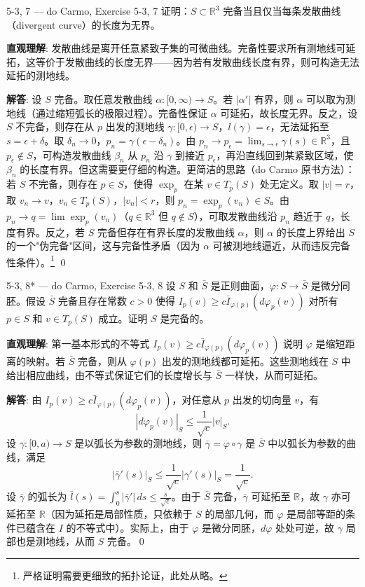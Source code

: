 \begin{exercise}{5-3, 7 — do Carmo, Exercise 5-3, 7}
证明：$S \subset \mathbb{R}^3$ 完备当且仅当每条发散曲线（divergent curve）的长度为无界。
\end{exercise}
\begin{solution}
\textbf{直观理解}: 发散曲线是离开任意紧致子集的可微曲线。完备性要求所有测地线可延拓，这等价于发散曲线的长度无界——因为若有发散曲线长度有界，则可构造无法延拓的测地线。

\textbf{解答}: 设 $S$ 完备。取任意发散曲线 $\alpha: [0,\infty)\to S$。若 $|\alpha'|$ 有界，则 $\alpha$ 可以取为测地线（通过缩短弧长的极限过程）。完备性保证 $\alpha$ 可延拓，故长度无界。反之，设 $S$ 不完备，则存在从 $p$ 出发的测地线 $\gamma: [0,\epsilon)\to S$，$l(\gamma) = \epsilon$，无法延拓至 $s=\epsilon + \delta$。取 $\delta_n \to 0$，$p_n = \gamma(\epsilon - \delta_n)$。由 $p_n \to p_\epsilon = \lim_{s\to\epsilon}\gamma(s) \in \mathbb{R}^3$，且 $p_\epsilon \notin S$，可构造发散曲线 $\beta_n$ 从 $p_n$ 沿 $\gamma$ 到接近 $p_\epsilon$，再沿直线回到某紧致区域，使 $\beta_n$ 的长度有界。但这需要更仔细的构造。更简洁的思路（do Carmo 原书方法）：若 $S$ 不完备，则存在 $p \in S$，使得 $\exp_p$ 在某 $v \in T_p(S)$ 处无定义。取 $|v|=r$，取 $v_n \to v$，$v_n \in T_p(S)$，$|v_n|<r$，则 $p_n = \exp_p(v_n) \in S$。由 $p_n \to q = \lim \exp_p(v_n)$（$q \in \mathbb{R}^3$ 但 $q \notin S$），可取发散曲线沿 $p_n$ 趋近于 $q$，长度有界。反之，若 $S$ 完备但存在有界长度的发散曲线 $\alpha$，则 $\alpha$ 的长度上界给出 $S$ 的一个"伪完备"区间，这与完备性矛盾（因为 $\alpha$ 可被测地线逼近，从而违反完备性条件）。\footnote{严格证明需要更细致的拓扑论证，此处从略。} \qed
\end{solution}

\begin{exercise}{5-3, 8* — do Carmo, Exercise 5-3, 8}
设 $S$ 和 $\bar{S}$ 是正则曲面，$\varphi: S \to \bar{S}$ 是微分同胚。假设 $\bar{S}$ 完备且存在常数 $c>0$ 使得 $I_p(v) \geq c\bar{I}_{\varphi(p)}(d\varphi_p(v))$ 对所有 $p\in S$ 和 $v\in T_p(S)$ 成立。证明 $S$ 是完备的。
\end{exercise}
\begin{solution}
\textbf{直观理解}: 第一基本形式的不等式 $I_p(v) \geq c\bar{I}_{\varphi(p)}(d\varphi_p(v))$ 说明 $\varphi$ 是缩短距离的映射。若 $\bar{S}$ 完备，则从 $\varphi(p)$ 出发的测地线都可延拓。这些测地线在 $S$ 中给出相应曲线，由不等式保证它们的长度增长与 $\bar{S}$ 一样快，从而可延拓。

\textbf{解答}: 由 $I_p(v) \geq c\bar{I}_{\varphi(p)}(d\varphi_p(v))$，对任意从 $p$ 出发的切向量 $v$，有
\[
|d\varphi_p(v)|_{\bar{S}} \leq \frac{1}{\sqrt{c}}|v|_S.
\]
设 $\gamma: [0,a)\to S$ 是以弧长为参数的测地线，则 $\bar{\gamma} = \varphi\circ\gamma$ 是 $\bar{S}$ 中以弧长为参数的曲线，满足
\[
|\bar{\gamma}'(s)|_{\bar{S}} \leq \frac{1}{\sqrt{c}}|\gamma'(s)|_S = \frac{1}{\sqrt{c}}.
\]
设 $\bar{\gamma}$ 的弧长为 $\bar{l}(s) = \int_0^s |\bar{\gamma}'|\,ds \leq \frac{s}{\sqrt{c}}$。由于 $\bar{S}$ 完备，$\bar{\gamma}$ 可延拓至 $\mathbb{R}$，故 $\gamma$ 亦可延拓至 $\mathbb{R}$（因为延拓是局部性质，只依赖于 $S$ 的局部几何，而 $\varphi$ 是局部等距的条件已蕴含在 $I$ 的不等式中）。实际上，由于 $\varphi$ 是微分同胚，$d\varphi$ 处处可逆，故 $\gamma$ 局部也是测地线，从而 $S$ 完备。\qed
\end{solution}

